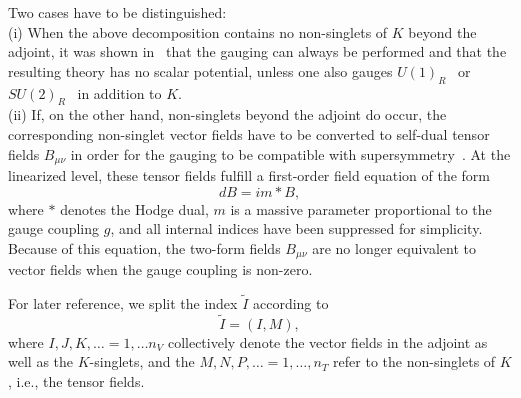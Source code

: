 \documentclass[a4paper,11pt]{article}
\newcommand{\ti}{\ensuremath{\tilde{I}}}
\begin{document}
Two cases have to be distinguished:\\

(i) When the above decomposition contains no non-singlets of $K$
beyond the adjoint, it was shown in~\cite{GST2} that the gauging
can always be performed and that the resulting theory has no
scalar potential, unless one also gauges $U(1)_R$~\cite{GZ1} or
$SU(2)_R$~\cite{GZ3} in addition to $K$.\\


(ii) If, on the other hand, non-singlets beyond the adjoint do occur,
the corresponding non-singlet vector fields have to be converted
to self-dual tensor fields $B_{\mu\nu}$ in order
for the gauging to be compatible with supersymmetry~\cite{GZ1}. At
the linearized level, these tensor fields fulfill a first-order
field equation of the form~\cite{PTvN}
\begin{equation}
dB=im \ast B,
\end{equation}
where $\ast$ denotes the Hodge dual, $m$ is a massive parameter
proportional to the gauge coupling $g$, and all internal indices
have been suppressed for simplicity. Because of this equation, the
two-form fields $B_{\mu\nu}$ are no longer equivalent to vector
fields when the gauge coupling is non-zero.

For later reference, we split the index $\ti$ according to
\begin{equation}
\ti=(I,M),
\end{equation}
where $I,J,K, \ldots=1,\ldots n_{V}$ collectively denote the
vector fields in the adjoint as well as the $K$-singlets, and the
$M,N,P,\ldots =1,\ldots, n_{T}$ refer to the non-singlets of $K$,
i.e., the tensor fields.
\end{document}

